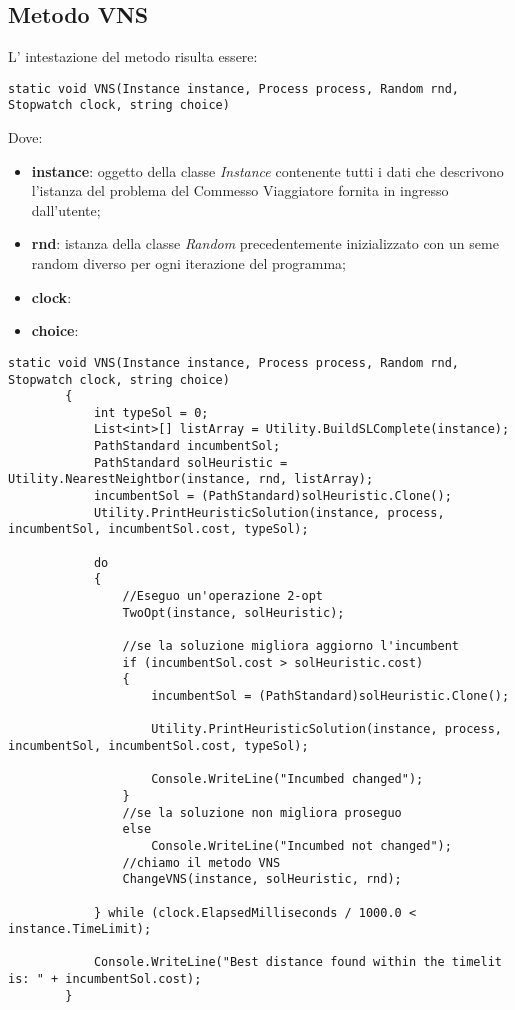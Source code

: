 \subsection{Metodo VNS}

L' intestazione del metodo risulta essere:

\begin{lstlisting}
static void VNS(Instance instance, Process process, Random rnd, Stopwatch clock, string choice)
\end{lstlisting}

Dove:

\begin{itemize}
    \item \textbf{instance}: oggetto della classe \textit{Instance} contenente tutti i dati che descrivono l'istanza del problema del Commesso Viaggiatore fornita in ingresso dall'utente;
    \item \textbf{rnd}: istanza della classe \textit{Random} precedentemente inizializzato con un seme random diverso per ogni iterazione del programma;
    \item \textbf{clock}:
    \item \textbf{choice}:
\end{itemize}

\begin{lstlisting}
static void VNS(Instance instance, Process process, Random rnd, Stopwatch clock, string choice)
        {
            int typeSol = 0;
            List<int>[] listArray = Utility.BuildSLComplete(instance);
            PathStandard incumbentSol;
            PathStandard solHeuristic = Utility.NearestNeightbor(instance, rnd, listArray);
            incumbentSol = (PathStandard)solHeuristic.Clone();
            Utility.PrintHeuristicSolution(instance, process, incumbentSol, incumbentSol.cost, typeSol);

            do
            {
            	//Eseguo un'operazione 2-opt 
                TwoOpt(instance, solHeuristic);
				
				//se la soluzione migliora aggiorno l'incumbent
                if (incumbentSol.cost > solHeuristic.cost)
                {
                    incumbentSol = (PathStandard)solHeuristic.Clone();

                    Utility.PrintHeuristicSolution(instance, process, incumbentSol, incumbentSol.cost, typeSol);

                    Console.WriteLine("Incumbed changed");
                }
                //se la soluzione non migliora proseguo
                else
                    Console.WriteLine("Incumbed not changed");
				//chiamo il metodo VNS
                ChangeVNS(instance, solHeuristic, rnd);

            } while (clock.ElapsedMilliseconds / 1000.0 < instance.TimeLimit);

            Console.WriteLine("Best distance found within the timelit is: " + incumbentSol.cost);
        }
\end{lstlisting}

